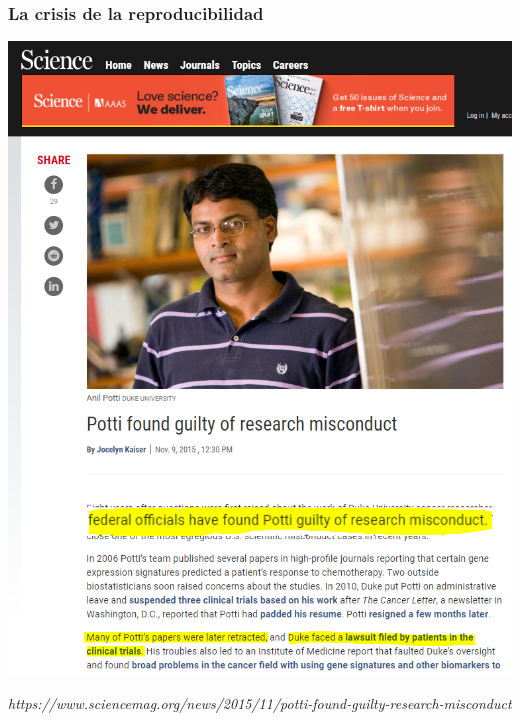 \documentclass[9pt]{beamer}
\begin{document}
\begin{frame}
  \frametitle{La crisis de la reproducibilidad}
  \begin{center}
    \includegraphics[height=0.85\textheight]{images/potti_portada_3}
  \end{center}
  \hfill\begin{minipage}[h]{0.8\linewidth}
    {\tiny \textit{https://www.sciencemag.org/news/2015/11/potti-found-guilty-research-misconduct}}
  \end{minipage}
\end{frame}
\end{document}
